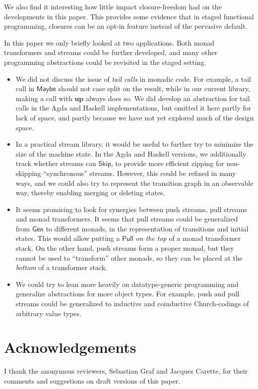 \documentclass[acmsmall]{acmart}
\newcommand{\msf}[1]{{\mathsf{#1}}}
\newcommand{\mbf}[1]{{\mathbf{#1}}}
\newcommand{\Maybe}{\msf{Maybe}}
\theoremstyle{remark}
\newcommand{\mup}{\mbf{up}}
\newcommand{\Gen}{\msf{Gen}}
\newcommand{\Skip}{\msf{Skip}}
\newcommand{\Pull}{\msf{Pull}}
\begin{document}
We also find it interesting how little impact closure-freedom had on the
developments in this paper. This provides some evidence that in staged
functional programming, closures can be an opt-in feature instead of the
pervasive default.

In this paper we only briefly looked at two applications. Both monad
transformers and streams could be further developed, and many other programming
abstractions could be revisited in the staged setting.
\begin{itemize}
\item
     We did not discuss the issue of \emph{tail calls} in monadic code. For
     example, a tail call in $\Maybe$ should not case split on the result, while
     in our current library, making a call with $\mup$ always does so. We did
     develop an abstraction for tail calls in the Agda and Haskell
     implementations, but omitted it here partly for lack of space, and partly
     because we have not yet explored much of the design space.

\item In a practical stream library, it would be useful to further try to
     minimize the size of the machine state. In the Agda and Haskell versions, we
     additionally track whether streams can $\Skip$, to provide more efficient
     zipping for non-skipping ``synchronous'' streams. However, this could be
     refined in many ways, and we could also try to represent the transition
     graph in an observable way, thereby enabling merging or deleting states.

\item It seems promising to look for synergies between push streams, pull streams
     and monad transformers. It seems that pull streams could be generalized from
     $\Gen$ to different monads, in the representation of transitions and initial
     states. This would allow putting a $\Pull$ \emph{on the top} of a monad
     transformer stack. On the other hand, push streams form a proper monad, but
     they cannot be used to ``transform'' other monads, so they can be placed
     at the \emph{bottom} of a transformer stack.
\item We could try to lean more heavily on datatype-generic programming and
     generalize abstractions for more object types. For example, push and pull
     streams could be generalized to inductive and coinductive Church-codings of
     arbitrary value types.
\end{itemize}

\section*{Acknowledgements}
I thank the anonymous reviewers, Sebastian Graf and Jacques Carette, for their
comments and suggestions on draft versions of this paper.
\end{document}
